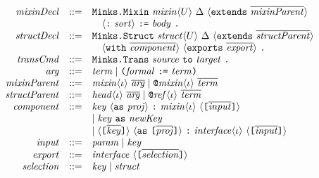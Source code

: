 \documentclass{article}
\newcommand{\ttt}[1]{\texttt{#1}}
\begin{document}
\newcommand{\grammarArg}{%
  \mathit{arg} &::=& \mathit{term}\mid \ttt{(}\mathit{formal}\ \ttt{:=}\ \mathit{term}\ttt{)}}
\newcommand{\grammarMixinDecl}{%
  \mathit{mixinDecl} &::=&
 \ttt{Minks.Mixin}\ \mathit{mixin}\langle U\rangle\ \Delta\
 \langle\ttt{extends}\ \overline{\mathit{mixinParent}}\rangle\\
 &&\quad \langle\ttt{:}\ \mathit{sort}\rangle\ \ttt{:=}\ \mathit{body}\ \ttt{.}}
\newcommand{\grammarMixinParent}{%
  \mathit{mixinParent} &::=& \mathit{mixin}\langle\iota\rangle\ \overline{\mathit{arg}}
 \mid \ttt{@}\mathit{mixin}\langle\iota\rangle\ \overline{\mathit{term}}}
\newcommand{\grammarStructDecl}{%
  \mathit{structDecl} &::=&
 \ttt{Minks.Struct}\ \mathit{struct}\langle U\rangle\ \Delta\
 \langle\ttt{extends}\ \overline{\mathit{structParent}}\rangle\\
 &&\quad \langle\ttt{with}\ \overline{\mathit{component}}\rangle\
 \langle\ttt{exports}\ \overline{\mathit{export}}\rangle\ \ttt{.}}
\newcommand{\grammarStructParent}{%
  \mathit{structParent} &::=& \mathit{head}\langle\iota\rangle\ \overline{\mathit{arg}}
 \mid \ttt{@}\mathit{ref}\langle\iota\rangle\ \overline{\mathit{term}}}
\newcommand{\grammarComponent}{%
  \mathit{component} &::=& \mathit{key}\ \langle\ttt{as}\ \mathit{proj}\rangle\
 \ttt{:}\ \mathit{mixin}\langle\iota\rangle\
 \langle\ttt{[}\overline{\mathit{input}}\ttt{]}\rangle\\
  &&\mid \mathit{key}\ \ttt{as}\ \mathit{newKey}\\
  &&\mid \langle\ttt{[}\overline{\mathit{key}}\ttt{]}\rangle\
    \langle\ttt{as}\ \ttt{[}\overline{\mathit{proj}}\ttt{]}\rangle\
    \ttt{:}\ \mathit{interface}\langle\iota\rangle\
    \langle\ttt{[}\overline{\mathit{input}}\ttt{]}\rangle}
\newcommand{\grammarInput}{%
  \mathit{input} &::=& \mathit{param}\mid\mathit{key}}
\newcommand{\grammarExport}{%
  \mathit{export} &::=& \mathit{interface}\ \langle\ttt{[}\overline{\mathit{selection}}\ttt{]}\rangle}
\newcommand{\grammarTrans}{%
  \mathit{transCmd} &::=& \ttt{Minks.Trans}\ \mathit{source}\ \ttt{to}\ \mathit{target}\ \ttt{.}}
\newcommand{\grammarSelection}{%
  \mathit{selection} &::=& \mathit{key}\mid\mathit{struct}}

\[
\begin{array}{@{}rcl@{}}
\grammarMixinDecl\\
\grammarStructDecl\\
\grammarTrans\\
\grammarArg\\
\grammarMixinParent\\
\grammarStructParent\\
\grammarComponent\\
\grammarInput\\
\grammarExport\\
\grammarSelection
\end{array}
\]
\end{document}
